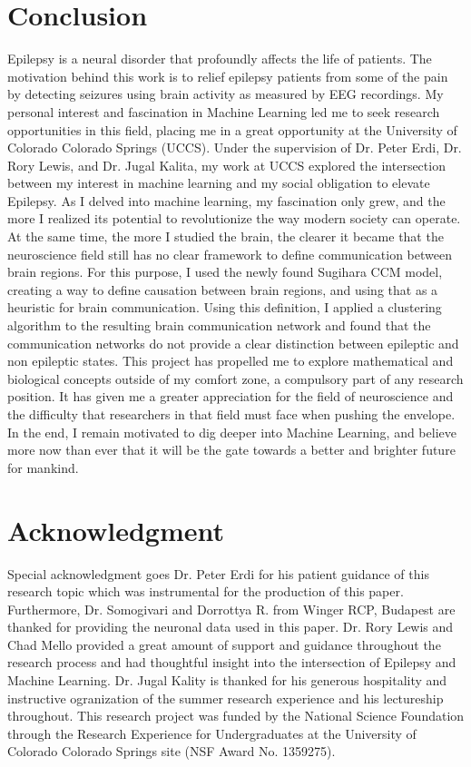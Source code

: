 \documentclass[journal,12pt,onecolumn,draftclsnofoot]{IEEEtran}  %
\begin{document}
\section{Conclusion}
Epilepsy is a neural disorder that profoundly affects the life of patients. The motivation behind this work is to relief epilepsy patients from some of the pain by detecting seizures using brain activity as measured by EEG recordings. My personal interest and fascination in Machine Learning led me to seek research opportunities in this field, placing me in a great opportunity at the University of Colorado Colorado Springs (UCCS). Under the supervision of Dr. Peter Erdi, Dr. Rory Lewis, and Dr. Jugal Kalita, my work at UCCS explored the intersection between my interest in machine learning and my social obligation to elevate Epilepsy. As I delved into machine learning, my fascination only grew, and the more I realized its potential to revolutionize the way modern society can operate. At the same time, the more I studied the brain, the clearer it became that the neuroscience field still has no clear framework to define communication between brain regions. For this purpose, I used the newly found Sugihara CCM model, creating a way to define causation between brain regions, and using that as a heuristic for brain communication. Using this definition, I applied a clustering algorithm to the resulting brain communication network and found that the communication networks do not provide a clear distinction between epileptic and non epileptic states. This project has propelled me to explore mathematical and biological concepts outside of my comfort zone, a compulsory part of any research position. It has given me a greater appreciation for the field of neuroscience and the difficulty that researchers in that field must face when pushing the envelope. In the end, I remain motivated to dig deeper into Machine Learning, and believe more now than ever that it will be the gate towards a better and brighter future for mankind.

\section*{Acknowledgment}

Special acknowledgment goes Dr. Peter Erdi for his patient guidance of this research topic which was instrumental for the production of this paper. Furthermore, Dr. Somogivari and Dorrottya R. from Winger RCP, Budapest are thanked for providing the neuronal data used in this paper. Dr. Rory Lewis and Chad Mello provided a great amount of support and guidance throughout the research process and had thoughtful insight into the intersection of Epilepsy and Machine Learning. Dr. Jugal Kality is thanked for his generous hospitality and instructive ogranization of the summer research experience and his lectureship throughout. This research project was funded by the National Science Foundation through the Research Experience for Undergraduates at the University of Colorado Colorado Springs site (NSF Award No. 1359275).

\pagebreak

\balance


\end{document}
